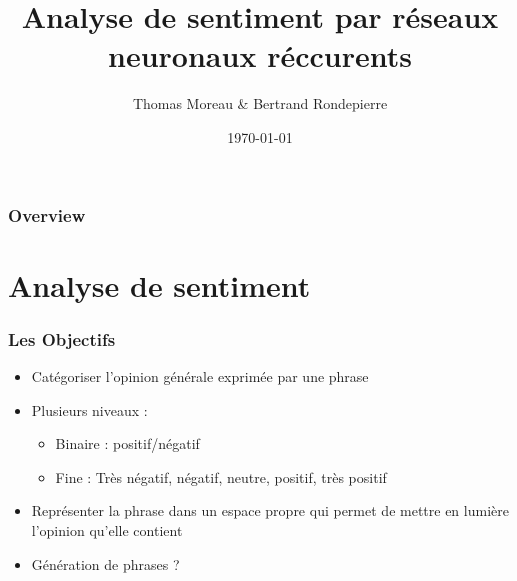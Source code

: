 \documentclass{beamer}
\title[Sentiment analysis with RNN]{Analyse de sentiment par réseaux neuronaux réccurents} %
\author{Thomas Moreau \& Bertrand Rondepierre} %
\institute[] %
{
Télécom paristech - MDI343 \\
}
\date{\today} %
\begin{document}
\begin{frame}
\titlepage %
\end{frame}

\begin{frame}
\frametitle{Overview} %
\tableofcontents %
\end{frame}


\section{Analyse de sentiment} %



\begin{frame}
\frametitle{Les Objectifs}
\begin{itemize}\setlength{\itemsep}{5mm}
\item Catégoriser l'opinion générale exprimée par une phrase
\item Plusieurs niveaux :
\begin{itemize}
\item Binaire : positif/négatif
\item Fine : Très négatif, négatif, neutre, positif, très positif
\end{itemize}
\item Représenter la phrase dans un espace propre qui permet de mettre en lumière l'opinion qu'elle contient
\item Génération de phrases ?
\end{itemize}
\end{frame}
\end{document}
